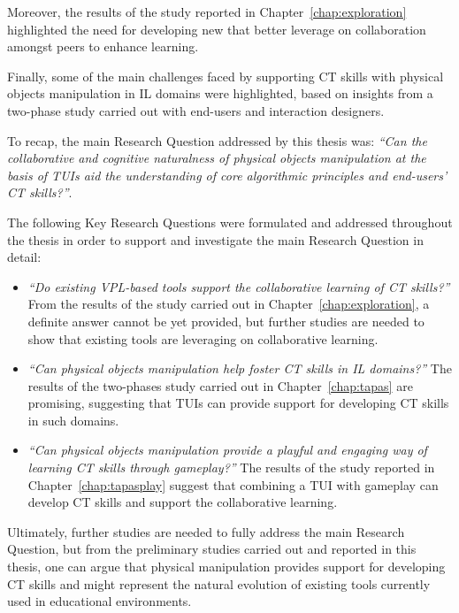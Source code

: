 Moreover, the results of the study reported in Chapter~\ref{chap:exploration} highlighted the need for developing new  that better leverage on collaboration amongst peers to enhance learning.

Finally, some of the main challenges faced by supporting \ac{CT} skills with physical objects manipulation in \ac{IL} domains were highlighted, based on insights from a two-phase study carried out with end-users and interaction designers.

To recap, the main Research Question addressed by this thesis was: \textit{``Can the collaborative and cognitive naturalness of physical objects manipulation at the basis of \aclp{TUI} aid the understanding of core algorithmic principles and  end-users' \acl{CT} skills?''}.

The following Key Research Questions were formulated and addressed throughout the thesis in order to support and investigate the main Research Question in detail:
\begin{itemize}
    \item \textit{``Do existing \ac{VPL}-based tools support the collaborative learning of \ac{CT} skills?''} From the results of the study carried out in Chapter~\ref{chap:exploration}, a definite answer cannot be yet provided, but further studies are needed to show that existing tools are leveraging on collaborative learning.
    \item \textit{``Can physical objects manipulation help foster \acl{CT} skills in \acl{IL} domains?''} The results of the two-phases study carried out in Chapter~\ref{chap:tapas} are promising, suggesting that \acp{TUI} can provide support for developing \ac{CT} skills in such domains.
    \item \textit{``Can physical objects manipulation provide a playful and engaging way of learning \ac{CT} skills through gameplay?''} The results of the study reported in Chapter~\ref{chap:tapasplay} suggest that combining a \ac{TUI} with gameplay can develop \ac{CT} skills and support the collaborative learning.
\end{itemize}

Ultimately, further studies are needed to fully address the main Research Question, but from the preliminary studies carried out and reported in this thesis, one can argue that physical manipulation provides support for developing \ac{CT} skills and might represent the natural evolution of existing tools currently used in educational environments.

